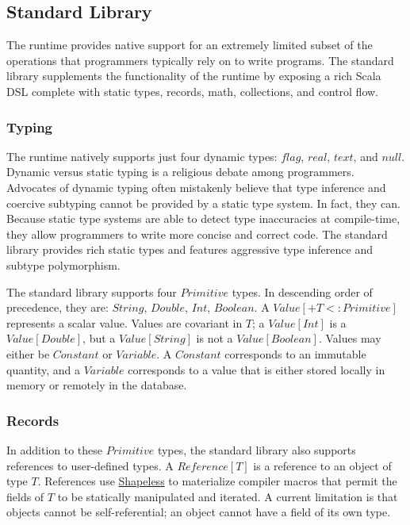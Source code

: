 \documentclass[12pt]{article}
\begin{document}
\subsection{Standard Library}
The runtime provides native support for an extremely limited subset of the operations that
programmers typically rely on to write programs. The standard library supplements the
functionality of the runtime by exposing a rich Scala DSL complete with static types, records,
math, collections, and control flow.

\subsubsection{Typing}
The runtime natively supports just four dynamic types: $flag$, $real$, $text$, and $null$.
Dynamic versus static typing is a religious debate among programmers. Advocates of dynamic
typing often mistakenly believe that type inference and coercive subtyping cannot be provided by
a static type system. In fact, they can. Because static type systems are able to
detect type inaccuracies at compile-time, they allow programmers to write more concise and
correct code. \cite{typing} The standard library provides rich static types and features
aggressive type inference and subtype polymorphism.

The standard library supports four $Primitive$ types. In descending order of precedence, they
are: $String$, $Double$, $Int$, $Boolean$. A $Value[+T <: Primitive]$ represents a scalar value.
Values are covariant in $T$; a $Value[Int]$ is a $Value[Double]$, but a $Value[String]$ is
not a $Value[Boolean]$. Values may either be $Constant$ or $Variable$. A $Constant$ corresponds
to an immutable quantity, and a $Variable$ corresponds to a value that is either stored locally
in memory or remotely in the database.

\subsubsection{Records}
In addition to these $Primitive$ types, the standard library also supports references to
user-defined types. A $Reference[T]$ is a reference to an object of type $T$. References use
\href{https://github.com/milessabin/shapeless}{Shapeless} to materialize compiler macros that
permit the fields of $T$ to be statically manipulated and iterated. A current limitation is that
objects cannot be self-referential; an object cannot have a field of its own type.
\end{document}
